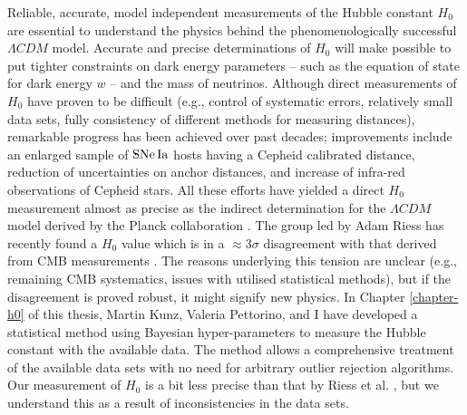 Reliable, accurate, model independent measurements of the Hubble constant $H_0$ are essential to understand the physics behind the phenomenologically successful $\Lambda CDM$ model. Accurate and precise determinations of $H_0$ will make possible to put tighter constraints on dark energy parameters -- such as the equation of state for dark energy $w$ -- and the mass of neutrinos. Although direct measurements of $H_0$ have proven to be difficult (e.g., control of systematic errors, relatively small data sets, fully consistency of different methods for measuring distances), remarkable progress has been achieved over past decades; improvements include an enlarged sample of $\mathrm{SNe\,Ia}$ hosts having a Cepheid calibrated distance, reduction of uncertainties on anchor distances, and increase of infra-red observations of Cepheid stars. All these efforts have yielded a direct $H_0$ measurement almost as precise as the indirect determination for the $\Lambda CDM$ model derived by the Planck collaboration \cite{Ade:2015xua,Riess:2016jrr}. The group led by Adam Riess has recently found a $H_0$ value which is in a $\approx 3\sigma$ disagreement with that derived from CMB measurements \cite{Riess:2016jrr}. The reasons underlying this tension are unclear (e.g., remaining CMB systematics, issues with utilised statistical methods), but if the disagreement is proved robust, it might signify new physics.  In Chapter \ref{chapter-h0} of this thesis, Martin Kunz, Valeria Pettorino, and I have developed a statistical method using Bayesian hyper-parameters to measure the Hubble constant with the available data. The method allows a comprehensive treatment of the available data sets with no need for arbitrary outlier rejection algorithms. Our measurement of $H_0$ is a bit less precise than that by Riess et al. \cite{Riess:2016jrr}, but we understand this as a result of inconsistencies in the data sets. 
